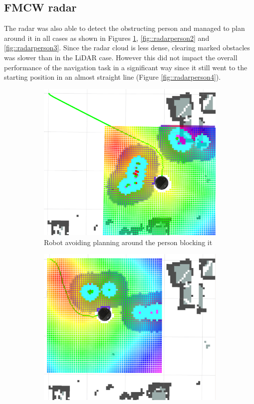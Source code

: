 \subsection*{\ac{FMCW} \ac{radar}}
The \ac{radar} was also able to detect the obstructing person and managed to plan around it in all cases as shown in Figures \ref{fig::radarperson1}, \ref{fig::radarperson2} and \ref{fig::radarperson3}. Since the radar cloud is less dense, clearing marked obstacles was slower than in the \ac{LiDAR} case. However this did not impact the overall performance of the navigation task in a significant way since it still went to the starting position in an almost straight line (Figure \ref{fig::radarperson4}).
\begin{figure}[h!]
  \centering
  \begin{subfigure}[b]{0.49\linewidth}
    \includegraphics[width=\linewidth]{imgs/chapter5/radarperson1.png}
     \caption{Robot avoiding planning around the person blocking it}
     \label{fig::radarperson1}
  \end{subfigure}
  \begin{subfigure}[b]{0.49\linewidth}
    \includegraphics[width=\linewidth]{imgs/chapter5/radarperson2.png}

\end{subfigure}
\end{figure}
